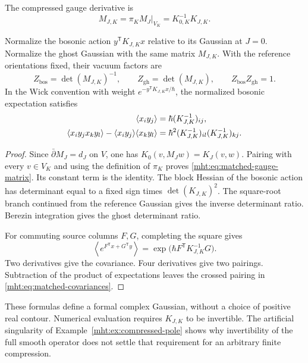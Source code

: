 \begin{proposition}\label{mht:prop:matched-gaussian}
The compressed gauge derivative is
\begin{equation}\label{mht:eq:matched-gauge-matrix}
 M_{J,K}=\pi_KM_J|_{V_K}=K_{0,K}^{-1}K_{J,K}.
\end{equation}

Normalize the bosonic action $y^{\mathsf T}K_{J,K}x$ relative to its
Gaussian at $J=0$. Normalize the ghost Gaussian with the same
matrix $M_{J,K}$. With the reference
orientations fixed, their vacuum factors are
\[
 Z_{\mathrm{bos}}=\det(M_{J,K})^{-1},\qquad
 Z_{\mathrm{gh}}=\det(M_{J,K}),\qquad
 Z_{\mathrm{bos}}Z_{\mathrm{gh}}=1.
\]
In the Wick convention with weight $e^{-y^{\mathsf T}K_{J,K}x/\hbar}$,
the normalized bosonic expectation satisfies
\begin{align}
 \langle x_i y_j\rangle
   &=\hbar(K_{J,K}^{-1})_{ij},\notag\\
 \langle x_i y_j x_k y_l\rangle
       -\langle x_i y_j\rangle\langle x_k y_l\rangle
   &=\hbar^2(K_{J,K}^{-1})_{il}(K_{J,K}^{-1})_{kj}.
 \label{mht:eq:matched-covariances}
\end{align}
\end{proposition}

\begin{proof}
Since $\bar\partial M_J=d_J$ on $V$, one has
$K_0(v,M_Jw)=K_J(v,w)$. Pairing with every $v\in V_K$ and using
the definition of $\pi_K$ proves
\eqref{mht:eq:matched-gauge-matrix}. Its constant term is the
identity. The block Hessian of the bosonic action has determinant
equal to a fixed sign times $\det(K_{J,K})^2$. The square-root branch
continued from the reference Gaussian gives the inverse determinant
ratio. Berezin integration gives the ghost determinant ratio.

For commuting source columns $F,G$, completing the square gives
\[
 \left\langle e^{F^{\mathsf T}x+G^{\mathsf T}y}\right\rangle
       =\exp\bigl(\hbar F^{\mathsf T}K_{J,K}^{-1}G\bigr).
\]
Two derivatives give the covariance. Four derivatives give two
pairings. Subtraction of the product of expectations leaves the
crossed pairing in \eqref{mht:eq:matched-covariances}.
\end{proof}

These formulas define a formal complex Gaussian, without a choice of
positive real contour. Numerical evaluation requires $K_{J,K}$ to
be invertible. The artificial singularity of
Example~\ref{mht:ex:compressed-pole} shows why invertibility of the
full smooth operator does not settle that requirement for an
arbitrary finite compression.

